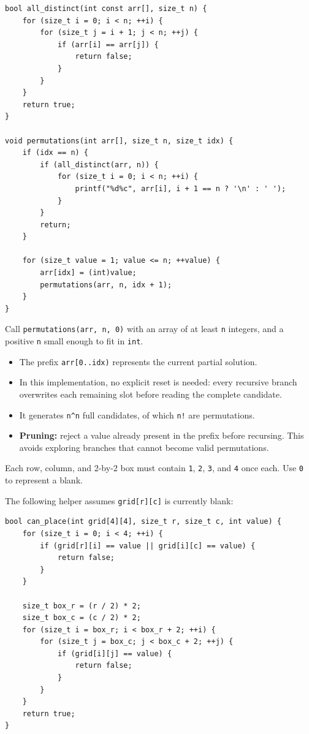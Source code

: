 \documentclass[11pt,a4paper]{article}
\providecommand{\tightlist}{\setlength{\itemsep}{0pt}\setlength{\parskip}{0pt}}
\begin{document}
\begin{lstlisting}[style=cscode]
bool all_distinct(int const arr[], size_t n) {
    for (size_t i = 0; i < n; ++i) {
        for (size_t j = i + 1; j < n; ++j) {
            if (arr[i] == arr[j]) {
                return false;
            }
        }
    }
    return true;
}

void permutations(int arr[], size_t n, size_t idx) {
    if (idx == n) {
        if (all_distinct(arr, n)) {
            for (size_t i = 0; i < n; ++i) {
                printf("%d%c", arr[i], i + 1 == n ? '\n' : ' ');
            }
        }
        return;
    }

    for (size_t value = 1; value <= n; ++value) {
        arr[idx] = (int)value;
        permutations(arr, n, idx + 1);
    }
}
\end{lstlisting}

Call \texttt{permutations(arr,\ n,\ 0)} with an array of at least \texttt{n} integers, and a positive \texttt{n} small enough to fit in \texttt{int}.

\begin{itemize}
\tightlist
\item
  The prefix \texttt{arr{[}0..idx)} represents the current partial solution.
\item
  In this implementation, no explicit reset is needed: every recursive branch overwrites each remaining slot before reading the complete candidate.
\item
  It generates \texttt{n\^{}n} full candidates, of which \texttt{n!} are permutations.
\item
  \textbf{Pruning:} reject a value already present in the prefix before recursing. This avoids exploring branches that cannot become valid permutations.
\end{itemize}

\label{example-4-by-4-sudoku}
\hypertarget{example-4-by-4-sudoku}{}

Each row, column, and 2-by-2 box must contain \texttt{1}, \texttt{2}, \texttt{3}, and \texttt{4} once each. Use \texttt{0} to represent a blank.

\label{testing-a-possible-placement}
\hypertarget{testing-a-possible-placement}{}

The following helper assumes \texttt{grid{[}r{]}{[}c{]}} is currently blank:

\begin{lstlisting}[style=cscode]
bool can_place(int grid[4][4], size_t r, size_t c, int value) {
    for (size_t i = 0; i < 4; ++i) {
        if (grid[r][i] == value || grid[i][c] == value) {
            return false;
        }
    }

    size_t box_r = (r / 2) * 2;
    size_t box_c = (c / 2) * 2;
    for (size_t i = box_r; i < box_r + 2; ++i) {
        for (size_t j = box_c; j < box_c + 2; ++j) {
            if (grid[i][j] == value) {
                return false;
            }
        }
    }
    return true;
}
\end{lstlisting}
\end{document}

